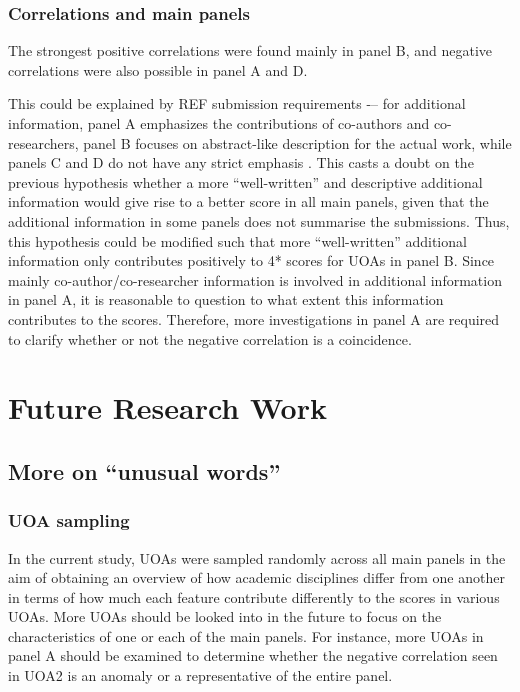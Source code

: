 \documentclass[a4paper, 11pt]{article}
\begin{document}
\subsubsection{Correlations and main panels}

The strongest positive correlations were found mainly in panel B, and negative correlations were also possible in panel A and D.

This could be explained by REF submission requirements -– for additional information, panel A emphasizes the contributions of co-authors and co-researchers, panel B focuses on abstract-like description for the actual work, while panels C and D do not have any strict emphasis \citep{REF_addinforsummary}. This casts a doubt on the previous hypothesis whether a more ``well-written'' and descriptive additional information would give rise to a better score in all main panels, given that the additional information in some panels does not summarise the submissions. Thus, this hypothesis could be modified such that more ``well-written'' additional information only contributes positively to 4* scores for UOAs in panel B. Since mainly co-author/co-researcher information is involved in additional information in panel A, it is reasonable to question to what extent this information contributes to the scores. Therefore, more investigations in panel A are required to clarify whether or not the negative correlation is a coincidence.



\section{Future Research Work}

\subsection{More on ``unusual words''}

\subsubsection{UOA sampling}

\noindent
In the current study, UOAs were sampled randomly across all main panels in the aim of obtaining an overview of how academic disciplines differ from one another in terms of how much each feature contribute differently to the scores in various UOAs. More UOAs should be looked into in the future to focus on the characteristics of one or each of the main panels. For instance, more UOAs in panel A should be examined to determine whether the negative correlation seen in UOA2 is an anomaly or a representative of the entire panel.\\
\end{document}
